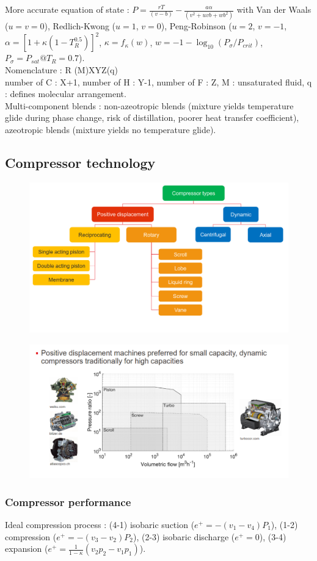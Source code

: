 \documentclass[../main.tex]{subfiles}
\begin{document}
More accurate equation of state : $P=  \frac{rT}{(v-b)} - \frac{a \alpha}{(v^2 +uvb + wb^2)}$ with Van der Waals ($u=v=0$), Redlich-Kwong ($u=1$, $v=0$), Peng-Robinson ($u=2$, $v=-1$, $\alpha = [1+\kappa (1-T_R^{0.5})]^2$, $\kappa = f_\kappa(w)$, $w = -1-\log_{10} (P_\sigma/P_{crit})$, $P_{\sigma} = P_{sat} @ T_R = 0.7$).\\
Nomenclature : R (M)XYZ(q)\\
number of C : X+1, number of H : Y-1, number of F : Z, M : unsaturated fluid, q : defines molecular arrangement.\\

Multi-component blends : non-azeotropic blends (mixture yields temperature glide during phase change, risk of distillation, poorer heat transfer coefficient), azeotropic blends (mixture yields no temperature glide).\\

\subsection{Compressor technology}

\begin{figure}[hbt!]
    \centering
    \includegraphics[width=0.5\linewidth]{IMAGES/HP/Screenshot from 2025-04-03 10-35-54.png}
\end{figure}

\begin{figure}[hbt!]
    \centering
    \includegraphics[width=0.5\linewidth]{IMAGES/HP/Screenshot from 2025-04-03 10-39-54.png}
\end{figure}

\subsubsection{Compressor performance}
Ideal compression process : (4-1) isobaric suction ($e^+ = -(v_1-v_4)P_1$), (1-2) compression ($e^+ = -(v_3-v_2)P_2$), (2-3) isobaric discharge ($e^+ = 0$), (3-4) expansion ($e^+ = \frac{1}{1-\kappa} (v_2p_2-v_1p_1)$). 
\end{document}
